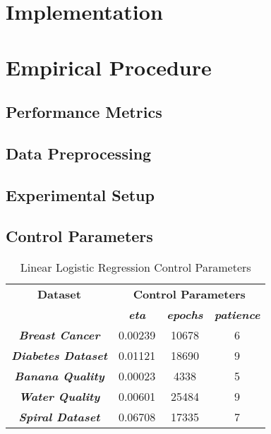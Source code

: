 \documentclass[10pt, conference]{IEEEtran}
\begin{document}
\section{Implementation} \label{section: Implementation}

\section{Empirical Procedure} \label{section: Empeirical Procedure}

\subsection{Performance Metrics}

\subsection{Data Preprocessing}

\subsection{Experimental Setup} \label{section: experimental_setup_emp}

\subsection{Control Parameters} \label{section: control_parameters}

\begin{table}[h!]
    \caption{Linear Logistic Regression Control Parameters}
    \begin{center}
        \begin{tabular}{|c||c|c|c|}
            \hline
            \textbf{Dataset}&\multicolumn{3}{|c|}{\textbf{Control Parameters}} \\
            \cline{2-4}
                        & \textbf{\textit{eta}} & \textbf{\textit{epochs}} & \textbf{\textit{patience}}\\
            \hline
            \textbf{\textit{Breast Cancer}} & 0.00239 & 10678 & 6 \\
            \textbf{\textit{Diabetes Dataset}} & 0.01121 & 18690 & 9\\
            \textbf{\textit{Banana Quality}}  & 0.00023 & 4338 & 5 \\
            \textbf{\textit{Water Quality}} & 0.00601 & 25484 & 9 \\
            \textbf{\textit{Spiral Dataset}} & 0.06708 & 17335 & 7\\
            \hline
        \end{tabular}
    \end{center}
    \label{table: LR_control_parameters}
\end{table}
\end{document}
